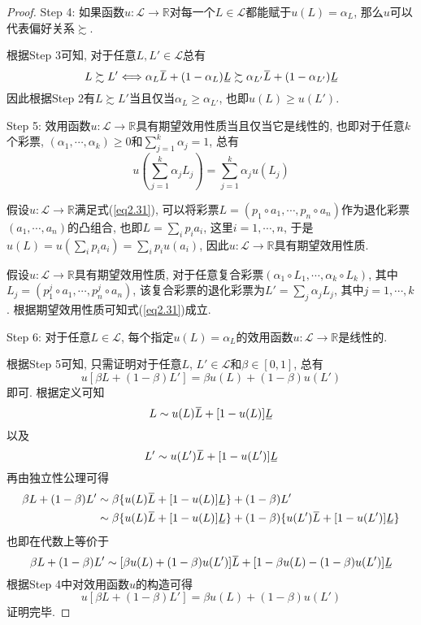 \documentclass[cn, 12pt, math=mtpro2, bibstyle=apa, blue]{elegantbook}
\newcommand{\R}{\mathbb{R}}
\newcommand{\overbar}[1]{\mkern 1.5mu\overline{\mkern-1.5mu#1\mkern-1.5mu}\mkern 1.5mu}
\newcommand{\ubar}[1]{\mkern 1.5mu\underline{\mkern-1.5mu#1\mkern-1.5mu}\mkern 1.5mu}
\begin{document}
\begin{proof}
  Step 4: 如果函数$u:\mathscr{L}\to\R$对每一个$L\in\mathscr{L}$都能赋于$u(L)=\alpha_L$, 那么$u$可以代表偏好关系$\succsim$.

  根据Step 3可知, 对于任意$L, L'\in\mathscr{L}$总有
  $$L\succsim L'\Longleftrightarrow \alpha_L\overbar{L}+(1-\alpha_L)\ubar{L}\succsim \alpha_{L'}\overbar{L}+(1-\alpha_{L'})\ubar{L}$$
  因此根据Step 2有$L\succsim L'$当且仅当$\alpha_L\geq \alpha_{L'}$, 也即$u(L)\geq u(L')$.

  Step 5: 效用函数$u:\mathscr{L}\to\R$具有期望效用性质当且仅当它是线性的, 也即对于任意$k$个彩票, $(\alpha_1,\cdots,\alpha_k)\ge 0$和$\sum_{j=1}^k \alpha_j=1$, 总有
  \begin{equation}\label{eq2.31}
    u\left(\sum_{j=1}^{k}\alpha_j L_j\right)=\sum_{j=1}^{k}\alpha_ju(L_j)
  \end{equation}

  假设$u:\mathscr{L}\to\R$满足式(\ref{eq2.31}), 可以将彩票$L=(p_1\circ a_1,\cdots, p_n\circ a_n)$作为退化彩票$(a_1,\cdots,a_n)$的凸组合, 也即$L=\sum_{i} p_ia_i$, 这里$i=1,\cdots,n$, 于是$u(L)=u(\sum_ip_ia_i)=\sum_ip_iu(a_i)$, 因此$u:\mathscr{L}\to\R$具有期望效用性质.

  假设$u:\mathscr{L}\to\R$具有期望效用性质, 对于任意复合彩票$(\alpha_1\circ L_1,\cdots,\alpha_k\circ L_k)$, 其中$L_j=(p_1^j\circ a_1,\cdots, p_n^j\circ a_n)$, 该复合彩票的退化彩票为$L'=\sum_j\alpha_jL_j$, 其中$j=1,\cdots,k$. 根据期望效用性质可知式(\ref{eq2.31})成立.

  Step 6: 对于任意$L\in\mathscr{L}$, 每个指定$u(L)=\alpha_L$的效用函数$u:\mathscr{L}\to\R$是线性的.

  根据Step 5可知, 只需证明对于任意$L$, $L'\in\mathscr{L}$和$\beta\in[0,1]$, 总有
  $$u[\beta L+(1-\beta)L']=\beta u(L)+(1-\beta)u(L')$$
  即可. 根据定义可知
  $$L\sim u(L)\overbar{L}+[1-u(L)]\ubar{L}$$
  以及
  $$L'\sim u(L')\overbar{L}+[1-u(L')]\ubar{L}$$
  再由独立性公理可得
  \begin{align*}
  \beta L+(1-\beta)L'&\sim\beta\{u(L)\overbar{L}+[1-u(L)]\ubar{L}\}+(1-\beta)L' \\
  &\sim\beta\{u(L)\overbar{L}+[1-u(L)]\ubar{L}\}+(1-\beta)\{u(L')\overbar{L}+[1-u(L')]\ubar{L}\}
  \end{align*}
  也即在代数上等价于
  $$\beta L+(1-\beta)L'\sim [\beta u(L)+(1-\beta)u(L')]\overbar{L}+[1-\beta u(L)-(1-\beta)u(L')]\ubar{L}$$
  根据Step 4中对效用函数$u$的构造可得
  $$u[\beta L+(1-\beta)L']=\beta u(L)+(1-\beta)u(L')$$
  证明完毕.
\end{proof}
\end{document}
